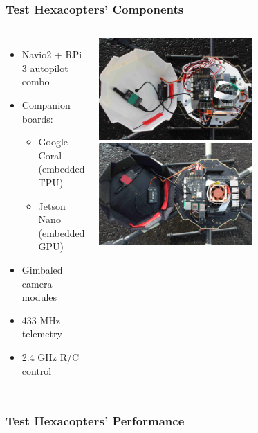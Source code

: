 \documentclass[aspectratio=169]{rubeamer}
\begin{document}
\begin{frame}
  \frametitle{Test Hexacopters' Components}
  \begin{columns}
    \begin{itemize}
      \item Navio2 + RPi 3 autopilot combo
      \item Companion boards:
      \begin{itemize}
        \item Google Coral (embedded TPU)
        \item Jetson Nano (embedded GPU)
      \end{itemize}
      \item Gimbaled camera modules
      \item 433 MHz telemetry
      \item 2.4 GHz R/C control
    \end{itemize}
    \centering
    \includegraphics[width=0.6\textwidth]{coral_electronics}\\
    \includegraphics[width=0.6\textwidth]{jetson_electronics}\\
  \end{columns}
\end{frame}

\begin{frame}
  \frametitle{Test Hexacopters' Performance}
  \begin{columns}
    \centering
  \end{columns}
\end{frame}
\end{document}
